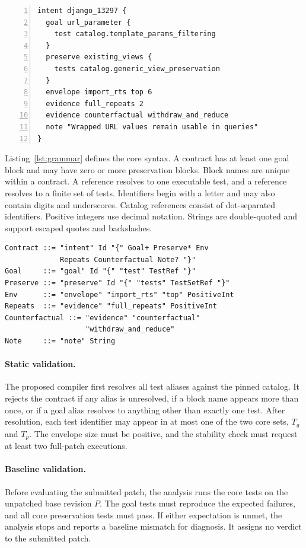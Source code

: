 \documentclass[a4paper,fleqn]{cas-sc}
\newcommand{\dsl}{\textsc{Shift-Intent}}
\newcommand{\code}[1]{\texttt{\detokenize{#1}}}
\begin{document}
\begin{lstlisting}[numbers=left,caption={Proposed \dsl{} contract for the running example.},label=lst:dsl]
intent django_13297 {
  goal url_parameter {
    test catalog.template_params_filtering
  }
  preserve existing_views {
    tests catalog.generic_view_preservation
  }
  envelope import_rts top 6
  evidence full_repeats 2
  evidence counterfactual withdraw_and_reduce
  note "Wrapped URL values remain usable in queries"
}
\end{lstlisting}

Listing~\ref{lst:grammar} defines the core syntax. A contract has at least one goal block and may have zero or more preservation blocks. Block names are unique within a contract. A \code{test} reference resolves to one executable test, and a \code{tests} reference resolves to a finite set of tests. Identifiers begin with a letter and may also contain digits and underscores. Catalog references consist of dot-separated identifiers. Positive integers use decimal notation. Strings are double-quoted and support escaped quotes and backslashes.

\begin{lstlisting}[numbers=none,basicstyle=\ttfamily\small,caption={Core grammar for the proposed notation. Quoted tokens are terminals.},label=lst:grammar]
Contract ::= "intent" Id "{" Goal+ Preserve* Env
             Repeats Counterfactual Note? "}"
Goal     ::= "goal" Id "{" "test" TestRef "}"
Preserve ::= "preserve" Id "{" "tests" TestSetRef "}"
Env      ::= "envelope" "import_rts" "top" PositiveInt
Repeats  ::= "evidence" "full_repeats" PositiveInt
Counterfactual ::= "evidence" "counterfactual"
                   "withdraw_and_reduce"
Note     ::= "note" String
\end{lstlisting}


\paragraph{Static validation.} The proposed compiler first resolves all test aliases against the pinned catalog. It rejects the contract if any alias is unresolved, if a block name appears more than once, or if a goal alias resolves to anything other than exactly one test. After resolution, each test identifier may appear in at most one of the two core sets, $T_g$ and $T_p$. The envelope size must be positive, and the stability check must request at least two full-patch executions.

\paragraph{Baseline validation.} Before evaluating the submitted patch, the analysis runs the core tests on the unpatched base revision $P$. The goal tests must reproduce the expected failures, and all core preservation tests must pass. If either expectation is unmet, the analysis stops and reports a baseline mismatch for diagnosis. It assigns no verdict to the submitted patch.
\end{document}
